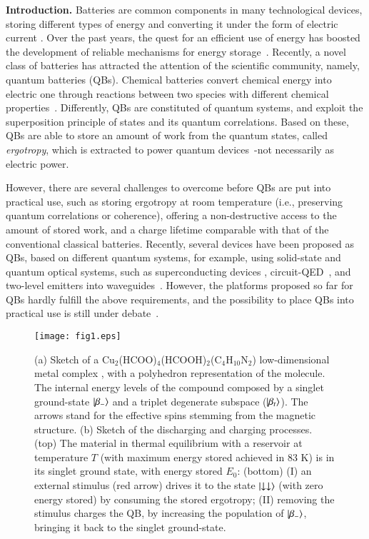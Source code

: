 \documentclass[aps,prl,epsfigure,twocolumn,superscriptaddress]{revtex4-1}
\newcommand{\1}{\mathbbm{1}}
\begin{document}
\textbf{Introduction.}  
Batteries are common components in many technological devices, storing  different types of energy and converting it under the form of electric current
\cite{li201830}. Over the past years, the quest for an efficient use of energy has boosted  the development of reliable mechanisms for energy storage~\cite{Liu:19,manzano2013scientific}. Recently, a novel class of batteries has attracted the attention of the scientific community, namely,  quantum batteries (QBs). Chemical batteries convert chemical energy into electric one through  reactions between two species with different chemical properties~\cite{li201830}. Differently, QBs are constituted of quantum systems, and exploit the superposition principle of states and its quantum correlations. Based on these, QBs are able to store an amount of work from the quantum states,  called \textit{ergotropy}, which is extracted to power quantum devices~\cite{Ferraro:18,Alicki:13,Binder:15,Santos:20c,CampbellBatteries,PRL2017Binder,PRL_Andolina,Baris:20,Santos:19-a,PhysRevE.102.042111,PhysRevLett.125.180603,Le:18}-not necessarily as electric power.

However, there are several challenges to overcome before QBs are put into practical use, such as storing ergotropy at room temperature (i.e., preserving quantum correlations or coherence), offering a non-destructive access to the amount of stored work, and a charge lifetime comparable with that of the conventional classical batteries. Recently, several devices have been proposed as QBs, based on different quantum systems, for example, using solid-state and quantum optical systems, such as superconducting devices \cite{strambini2020josephson}, circuit-QED~\cite{PRL_Andolina,Rossini:20}, and two-level emitters into waveguides~\cite{Alexia:20}. However, the platforms proposed so far for QBs hardly fulfill the above requirements, and the possibility to place QBs into practical use is still under debate~\cite{Alexia:20,strambini2020josephson}. 

\begin{figure}[t!]
	\centering
	\texttt{[image: fig1.eps]}
	\caption{{\color{blue}(a)} Sketch of a Cu$_2$(HCOO)$_4$(HCOOH)$_2$(C$_4$H$_{10}$N$_2$) low-dimensional metal complex \cite{ccdc,vesta}, with a polyhedron representation of the molecule. The internal energy levels of the compound composed by a singlet ground-state $\ket{\beta_{-}}$ and a triplet degenerate subspace ($\ket{\beta_{t}}$). 
		The arrows stand for the effective spins stemming from the magnetic structure. {\color{blue}(b)} Sketch of the discharging and charging  processes. (top) The material in thermal equilibrium with a reservoir at temperature $T$ (with maximum energy stored achieved in 83 K) is in its singlet ground state, with energy stored $E_0$: (bottom) (I) an external stimulus (red arrow) drives it to the state $\ket{\downarrow\downarrow}$ (with zero energy stored) by consuming the stored ergotropy; (II) removing the stimulus charges the QB, by increasing the population of $\ket{\beta_{-}}$, bringing it back to the singlet ground-state.}
	\label{structure}
\end{figure}
\end{document}
